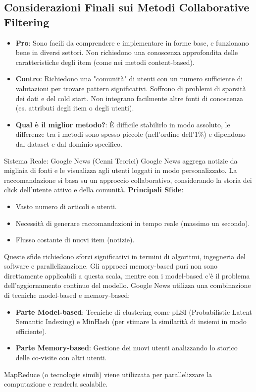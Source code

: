\documentclass{article}
\begin{document}
\subsection{Considerazioni Finali sui Metodi Collaborative Filtering}
\begin{itemize}
    \item \textbf{Pro}: Sono facili da comprendere e implementare in forme base, e funzionano bene in diversi settori. Non richiedono una conoscenza approfondita delle caratteristiche degli item (come nei metodi content-based).
    \item \textbf{Contro}: Richiedono una "comunità" di utenti con un numero sufficiente di valutazioni per trovare pattern significativi. Soffrono di problemi di sparsità dei dati e del cold start. Non integrano facilmente altre fonti di conoscenza (es. attributi degli item o degli utenti).
    \item \textbf{Qual è il miglior metodo?}: È difficile stabilirlo in modo assoluto, le differenze tra i metodi sono spesso piccole (nell'ordine dell'1\%) e dipendono dal dataset e dal dominio specifico.
\end{itemize}

\begin{examplebox}{Sistema Reale: Google News (Cenni Teorici)}
    Google News aggrega notizie da migliaia di fonti e le visualizza agli utenti loggati in modo personalizzato. La raccomandazione si basa su un approccio collaborativo, considerando la storia dei click dell'utente attivo e della comunità.
    \textbf{Principali Sfide}:
    \begin{itemize}
        \item Vasto numero di articoli e utenti.
        \item Necessità di generare raccomandazioni in tempo reale (massimo un secondo).
        \item Flusso costante di nuovi item (notizie).
    \end{itemize}
    Queste sfide richiedono sforzi significativi in termini di algoritmi, ingegneria del software e parallelizzazione.
    Gli approcci memory-based puri non sono direttamente applicabili a questa scala, mentre con i model-based c'è il problema dell'aggiornamento continuo del modello. Google News utilizza una combinazione di tecniche model-based e memory-based:
    \begin{itemize}
        \item \textbf{Parte Model-based}: Tecniche di clustering come pLSI (Probabilistic Latent Semantic Indexing) e MinHash (per stimare la similarità di insiemi in modo efficiente).
        \item \textbf{Parte Memory-based}: Gestione dei nuovi utenti analizzando lo storico delle co-visite con altri utenti.
    \end{itemize}
    MapReduce (o tecnologie simili) viene utilizzata per parallelizzare la computazione e renderla scalabile.
\end{examplebox}
\end{document}

